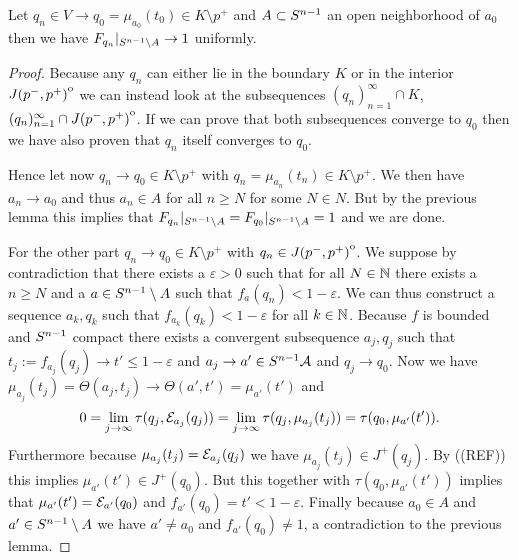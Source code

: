 \begin{lemma}
    Let $q_n\in V\to q_0=\mu_{a_0}(t_0)\in K\setminus{p^+}$ and $A\subset {S^{n-1}}$ an open neighborhood of $a_0$ then we have $F_{q_n}\rvert_{{S^{n-1}}\setminus A} \to 1$ uniformly.
\end{lemma}
\begin{proof}
    Because any $q_n$ can either lie in the boundary $K$ or in the interior ${\kern0ptJ(p^-,p^+)}^{\mathrm{o}}$ we can instead look at the subsequences $(q_n)_{n=1}^\infty \cap K$, $(q_n)_{n=1}^\infty \cap {\kern0ptJ(p^-,p^+)}^{\mathrm{o}}$. If we can prove that both subsequences converge to $q_0$ then we have also proven that $q_n$ itself converges to $q_0$. 

    Hence let now $q_n \to q_0\in K\setminus p^+$ with $q_n=\mu_{a_n}(t_n) \in K\setminus p^+$. We then have $a_n\to a_0$ and thus $a_n \in A$ for all $n\ge N$ for some $N\in N$. But by the previous lemma this implies that $F_{q_n}\rvert_{{S^{n-1}}\setminus A} = F_{q_0}\rvert_{{S^{n-1}}\setminus A} = 1$ and we are done.

    For the other part $q_n \to q_0\in K\setminus p^+$ with $q_n \in {\kern0ptJ(p^-,p^+)}^{\mathrm{o}}$.
    We suppose by contradiction that there exists a $\varepsilon>0$ such that for all $N\in \mathbb{N}$ there exists a $n\ge N$ and a $a\in {S^{n-1}}\setminus A$ such that $f_a(q_n)<1-\varepsilon$. We can thus construct a sequence $a_k, q_k$ such that $f_{a_k}(q_k)<1-\varepsilon$ for all $k\in \mathbb{N}$. Because $f$ is bounded and ${S^{n-1}}$ compact there exists a convergent subsequence $a_j,q_j$ such that $t_j:=f_{a_j}(q_j)\to t'\leq 1-\varepsilon$ and $a_j \to a'\in {S^{n-1}}\mathcal{A}$ and $q_j\to q_0$. Now we have $\mu_{a_j}(t_j) = \Theta(a_j,t_j) \to \Theta(a',t')=\mu_{a'}(t')$ and 
    \[
        0 = \lim_{j\to \infty}\tau(q_j,{\mathcal{E}}_{a_j}(q_j)) = \lim_{j\to \infty}\tau(q_j,\mu_{a_j}(t_j)) = \tau(q_0,\mu_{a'}(t')).
    \]
    Furthermore because $\mu_{a_j}(t_j)={\mathcal{E}}_{a_j}(q_j)$ we have $\mu_{a_j}(t_j)\in J^+(q_j)$. By ((REF)) this implies $\mu_{a'}(t')\in J^+(q_0)$. But this together with $\tau(q_0,\mu_{a'}(t'))$ implies that $\mu_{a'}(t')={\mathcal{E}}_{a'}(q_0)$ and $f_{a'}(q_0)=t'<1-\varepsilon$. Finally because $a_0\in A$ and $a'\in {S^{n-1}}\setminus A$ we have $a'\neq a_0$ and $f_{a'}(q_0)\neq 1$, a contradiction to the previous lemma.
\end{proof}

